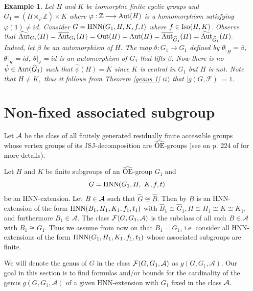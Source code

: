 \documentclass[a4paper,12pt]{article}
\newcommand{\A}{{\cal A}}
\newcommand{\Oe}{\rm \widehat{OE}}
\newcommand{\F}{{\cal F}}
\def\aut {{\rm Aut}}
\def\out {{\rm Out}}
\def\hnn {{\rm HNN}}
\def\Iso {{\rm Iso}}
\newtheorem{exa}[thm]{Example}
\begin{document}
{\begin{exa} Let $H$ and $K$ be  isomorphic finite cyclic groups and $G_1= (H\rtimes_{\varphi}\mathbb{Z})\times K$ where  $\varphi:\mathbb{Z}\longrightarrow \aut(H)$ is a homomorphism satisfying   $\varphi(1)\neq id.$ Consider $G=\hnn(G_1,H,K,f,t)$ where $f\in \Iso(H,K)$. Observe that $\widetilde{\aut}_{G_1}(H)=\overline{\aut}_{G_1}(H)=\out(H)=\aut(H)=\overline{\aut}_{\widehat G_1}(H)=\widetilde{\aut}_{\widehat G_1}(H).$ Indeed, let $\beta$ be an automorphism of $H$. The map $\theta:G_1\longrightarrow G_1$ defined by $\theta|_{H}=\beta$, $\theta|_{K}=id$, $\theta|_{\mathbb{Z}}=id$ is an automorphism of $G_1$ that lifts $\beta$. Now there is no $\hat \psi\in \aut(\widehat G_1)$ such that $\hat \psi(H)=K$ since $K$ is central in $G_1$ but $H$ is not. Note that $H \neq K,$ thus it follows from Theorem \ref{genus 1} $ii)$ that $|g(G, \mathcal{F})|=1$.
 
\end{exa}

\section{Non-fixed associated subgroup} \label{non fixed}

Let $\A$ be the class of all finitely generated residually finite accessible groups whose vertex groups of its JSJ-decomposition are $\Oe$-groups (see  on p. 224 of \cite{BPZ} for more details). 

Let $H$ and $K$ be finite subgroups of an $\Oe$-group $G_1$ and $$G=\hnn(G_1, H,\ K, f, t)$$ be an HNN-extension. Let $B\in \A$ such that $\widehat G \cong \widehat B.$ Then by \cite[Theorem 1.1]{BPZ} $B$ is an HNN-extension of the form $\hnn(B_1, H_1, K_1, f_1, t_1)$ with $\widehat B_1\cong \widehat G_1, H \cong H_1\cong K \cong K_1,$ and furthermore $B_1 \in \mathcal{A}$. The class $\F(G,G_1,\A)$ is the subclass of all such $B \in \mathcal{A}$ with $B_1\cong G_1$. Thus we assume from now on that $B_1=G_1$, i.e. consider all HNN-extensions of the form $\hnn(G_1, H_1, K_1, f_1, t_1)$ whose associated  subgroups are finite. 

 We will denote the genus of $G$ in the class $\F(G,G_1,\A)$ as $g(G, G_1, \mathcal{A}).$ Our goal in this section is to find formulas and/or bounds for the cardinality of the genus $g(G, G_1, \mathcal{A})$ of a given HNN-extension with $G_1$ fixed in the class $\A$.

}
\end{document}

